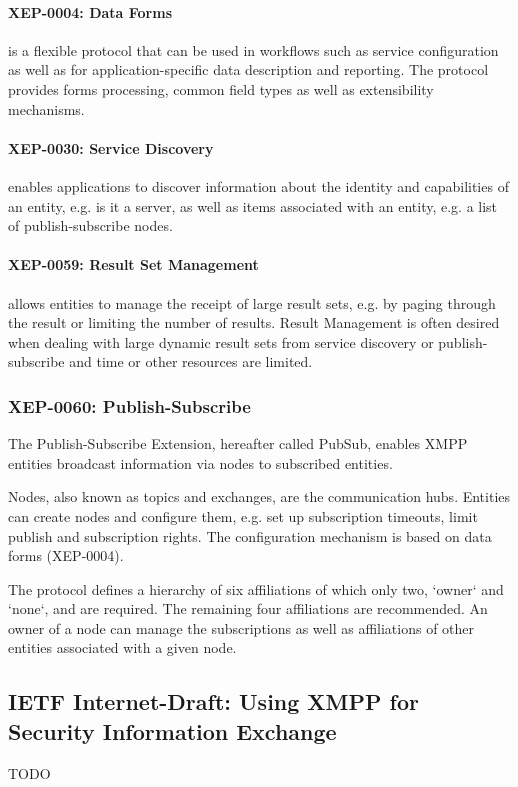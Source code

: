 \paragraph{XEP-0004: Data Forms} is a flexible protocol that can be used in workflows such as service configuration as well as for application-specific data description and reporting. The protocol provides forms processing, common field types as well as extensibility mechanisms. \cite{xep-0004} 

\paragraph{XEP-0030: Service Discovery} enables applications to discover information about the identity and capabilities of an entity, e.g. is it a server, as well as items associated with an entity, e.g. a list of publish-subscribe nodes. \cite{xep-0030}

\paragraph{XEP-0059: Result Set Management} allows entities to manage the receipt of large result sets, e.g. by paging through the result or limiting the number of results. Result Management is often desired when dealing with large dynamic result sets from service discovery or publish-subscribe and time or other resources are limited. \cite{xep-0059} 

\subsubsection{XEP-0060: Publish-Subscribe}

The Publish-Subscribe Extension, hereafter called PubSub, enables XMPP entities broadcast information via nodes to subscribed entities. \cite{xep-0060}

Nodes, also known as topics and exchanges, are the communication hubs. Entities can create nodes and configure them, e.g. set up subscription timeouts, limit publish and subscription rights. The configuration mechanism is based on data forms (XEP-0004).

The protocol defines a hierarchy of six affiliations of which only two, `owner` and `none`, and are required. The remaining four affiliations are recommended. An owner of a node can manage the subscriptions as well as affiliations of other entities associated with a given node. %

\subsection{IETF Internet-Draft: Using XMPP for Security Information Exchange}
TODO \cite{ietf-mile-xmpp-grid-05}
